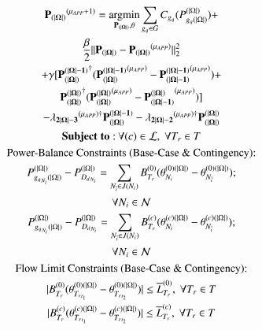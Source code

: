 \documentclass[preprint,12pt,3p]{elsarticle}
\begin{document}
\begin{subequations}\label{Look-Ahead_General_Third_Interval_Angle}
\begin{gather}
\mathbf{P_{(|\Omega|)}}^{(\mu_{APP}+1)}= \argmin_{\mathbf{P_{(|\Omega|)}},\theta} \sum_{{g_q}\in G}C_{g_q}(P_{{g_q}(|\Omega|)}^{(|\Omega|)})+\notag\\ \frac{\beta}{2}||\mathbf{P_{(|\Omega|)}}-\mathbf{P_{(|\Omega|)}}^{(\mu_{APP})}||_2^2\notag\\+ \gamma[\mathbf{P_{(|\Omega|)}^{(|\Omega|-1)}}^{\dagger}(\mathbf{P_{(|\Omega|)}^{(|\Omega|-1)}}^{(\mu_{APP})}-\mathbf{P_{(|\Omega|-1)}^{(|\Omega|-1)}}^{(\mu_{APP})})+\notag\\\mathbf{P_{(|\Omega|)}^{(|\Omega|)}}^{\dagger}(\mathbf{P_{(|\Omega|)}^{(|\Omega|)}}^{(\mu_{APP})}-\mathbf{P_{(|\Omega|-1)}^{(|\Omega|)}}^{(\mu_{APP})})]\notag\\- \mathbf{\lambda_{2|\Omega|-3}}^{(\mu_{APP})\dagger}\mathbf{P_{(|\Omega|)}^{(|\Omega|-1)}}-\mathbf{\lambda_{2|\Omega|-2}}^{(\mu_{APP})\dagger}\mathbf{P_{(|\Omega|)}^{(|\Omega|)}}\label{first_Look-Ahead_General_Third_Interval_Angle}\\
\mathbf{Subject\;to:}\:\forall(c)\in\mathcal{L},\;\forall T_r\in T\notag\\
\text{Power-Balance Constraints (Base-Case \& Contingency):}\notag\\
P_{{g_q}_{N_i}(|\Omega|)}^{(|\Omega|)}-P_{{D_d}_{N_i}}^{(|\Omega|)}=\sum_{N_{\overline{i}}\in{J(N_i)}}B_{T_r}^{(0)}(\theta_{N_i}^{(0)(|\Omega|)}-\theta_{N_{\overline{i}}}^{(0)(|\Omega|)});\notag\\\forall{{N_i}\in\mathcal{N}}\label{second_Look-Ahead_General_Third_Interval_Angle}\\
P_{{g_q}_{N_i}(|\Omega|)}^{(|\Omega|)}-P_{{D_d}_{N_i}}^{(|\Omega|)}=\sum_{N_{\overline{i}}\in{J(N_i)}}B_{T_r}^{(c)}(\theta_{N_i}^{(c)(|\Omega|)}-\theta_{N_{\overline{i}}}^{(c)(|\Omega|)});\notag\\\forall{{N_i}\in\mathcal{N}}\label{secondA_Look-Ahead_General_Third_Interval_Angle}\\
\text{Flow Limit Constraints (Base-Case \& Contingency):}\notag\\
|B_{T_r}^{(0)}(\theta_{{T_r}_{t_1}}^{(0)(|\Omega|)}-\theta_{{T_r}_{t_2}}^{(0)(|\Omega|)})|\leq{{\overline{L}}_{T_r}^{(0)}},\;\forall{T_r\in{T}}\label{third_Look-Ahead_General_Third_Interval_Angle}\\
|B_{T_r}^{(c)}(\theta_{{T_r}_{t_1}}^{(c)(|\Omega|)}-\theta_{{T_r}_{t_2}}^{(c)(|\Omega|)})|\leq{{\overline{L}}_{T_r}^{(c)}},\;\forall{T_r\in{T}}\label{third1_Look-Ahead_General_Third_Interval_Angle}\\

\end{gather}
\end{subequations}
\end{document}
